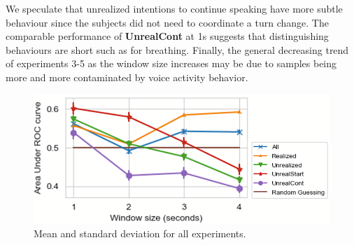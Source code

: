 \documentclass[manuscript,screen,review]{acmart}
\begin{document}
We speculate that unrealized intentions to continue speaking have more subtle behaviour since the subjects did not need to coordinate a turn change. The comparable performance of \textbf{UnrealCont} at 1s suggests that distinguishing behaviours are short such as for breathing. Finally, the general decreasing trend of experiments 3-5 as the window size increases may be due to samples being more and more contaminated by voice activity behavior. 





\begin{figure}[tb]
  \includegraphics[width=0.5\columnwidth]{samples/result-all-2.png}
  \vspace{-5mm}
  \caption{ 
  Mean and standard deviation for all experiments.
}
\vspace{-5mm}
  \label{fig:all-result}
\end{figure}
\end{document}
